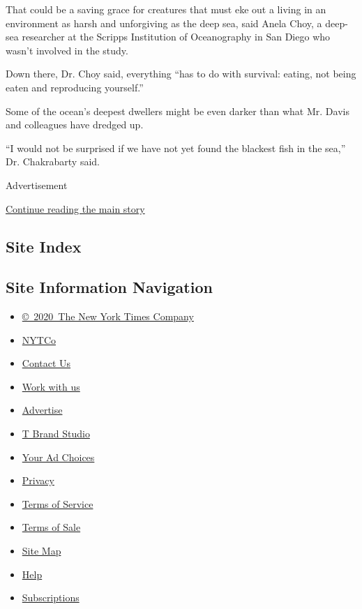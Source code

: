 That could be a saving grace for creatures that must eke out a living in
an environment as harsh and unforgiving as the deep sea, said Anela
Choy, a deep-sea researcher at the Scripps Institution of Oceanography
in San Diego who wasn't involved in the study.

Down there, Dr. Choy said, everything ``has to do with survival: eating,
not being eaten and reproducing yourself.''

Some of the ocean's deepest dwellers might be even darker than what Mr.
Davis and colleagues have dredged up.

``I would not be surprised if we have not yet found the blackest fish in
the sea,'' Dr. Chakrabarty said.

Advertisement

\protect\hyperlink{after-bottom}{Continue reading the main story}

\hypertarget{site-index}{%
\subsection{Site Index}\label{site-index}}

\hypertarget{site-information-navigation}{%
\subsection{Site Information
Navigation}\label{site-information-navigation}}

\begin{itemize}
\tightlist
\item
  \href{https://help.nytimes.com/hc/en-us/articles/115014792127-Copyright-notice}{©~2020~The
  New York Times Company}
\end{itemize}

\begin{itemize}
\tightlist
\item
  \href{https://www.nytco.com/}{NYTCo}
\item
  \href{https://help.nytimes.com/hc/en-us/articles/115015385887-Contact-Us}{Contact
  Us}
\item
  \href{https://www.nytco.com/careers/}{Work with us}
\item
  \href{https://nytmediakit.com/}{Advertise}
\item
  \href{http://www.tbrandstudio.com/}{T Brand Studio}
\item
  \href{https://www.nytimes.com/privacy/cookie-policy\#how-do-i-manage-trackers}{Your
  Ad Choices}
\item
  \href{https://www.nytimes.com/privacy}{Privacy}
\item
  \href{https://help.nytimes.com/hc/en-us/articles/115014893428-Terms-of-service}{Terms
  of Service}
\item
  \href{https://help.nytimes.com/hc/en-us/articles/115014893968-Terms-of-sale}{Terms
  of Sale}
\item
  \href{https://spiderbites.nytimes.com}{Site Map}
\item
  \href{https://help.nytimes.com/hc/en-us}{Help}
\item
  \href{https://www.nytimes.com/subscription?campaignId=37WXW}{Subscriptions}
\end{itemize}
